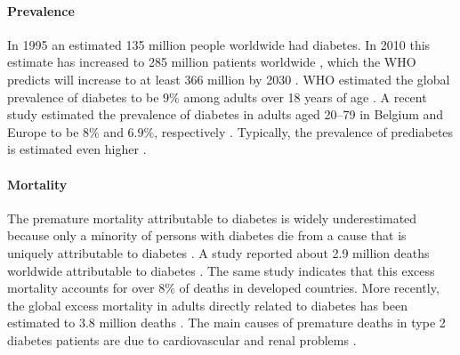 \paragraph{Prevalence} In 1995 an estimated 135 million people worldwide had diabetes. In 2010 this estimate has increased to 285 million patients worldwide \citep{shaw2010global, chen2012worldwide}, which the WHO predicts will increase to at least 366 million by 2030 \citep{smyth2006diabetes}. WHO estimated the global prevalence of diabetes to be $9\%$ among adults over 18 years of age \citep{alwan2011global}. A recent study estimated the prevalence of diabetes in adults aged 20--79 in Belgium and Europe to be $8\%$ and $6.9\%$, respectively \citep{shaw2010global}. Typically, the prevalence of prediabetes is estimated even higher \citep{cowie2009full,yang2010prevalence,chen2012worldwide}.

\paragraph{Mortality} 
The premature mortality attributable to diabetes is widely underestimated because only a minority of persons with diabetes die from a cause that is uniquely attributable to diabetes \citep{beulens2010global}. A study reported about 2.9 million deaths worldwide attributable to diabetes \citep{roglic2005burden}. The same study indicates that this excess mortality accounts for over $8\%$ of deaths in developed countries. More recently, the global excess mortality in adults directly related to diabetes has been estimated to 3.8 million deaths \citep{beulens2010global}. The main causes of premature deaths in type 2 diabetes patients are due to cardiovascular and renal problems \citep{morrish2001mortality, beulens2010global}.


